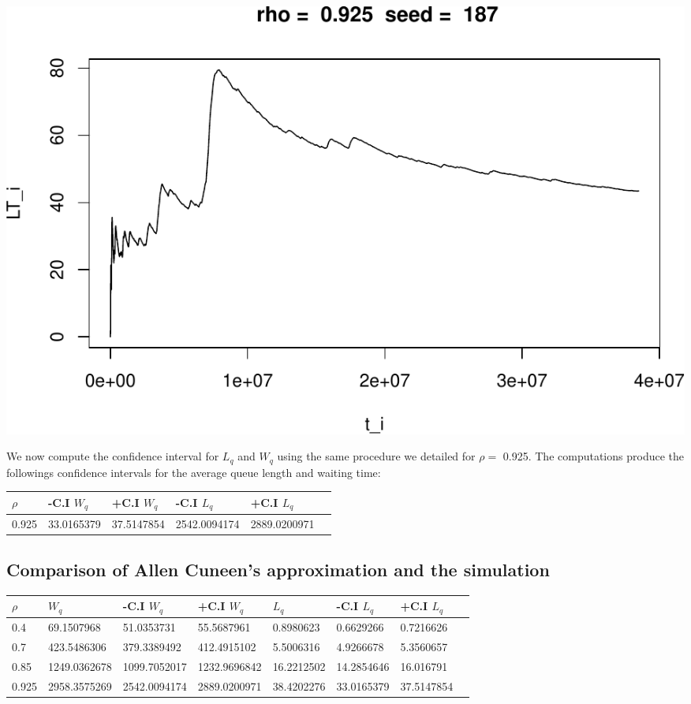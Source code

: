 \documentclass[]{article}
\begin{document}
\includegraphics{003_files/figure-latex/unnamed-chunk-22-10.pdf}

We now compute the confidence interval for \(L_{q}\) and \(W_{q}\) using
the same procedure we detailed for \(\rho =\) 0.925. The computations
produce the followings confidence intervals for the average queue length
and waiting time:

\begin{longtable}[]{@{}llllll@{}}
\toprule
\(\rho\) & -C.I \(W_{q}\) & +C.I \(W_{q}\) & -C.I \(L_{q}\) & +C.I
\(L_{q}\) &\tabularnewline
\midrule
\endhead
0.925 & 33.0165379 & 37.5147854 & 2542.0094174 &
2889.0200971\tabularnewline
\bottomrule
\end{longtable}

\subsection{Comparison of Allen Cuneen's approximation and the
simulation}\label{comparison-of-allen-cuneens-approximation-and-the-simulation}

\begin{longtable}[]{@{}llllllll@{}}
\toprule
\(\rho\) & \(W_{q}\) & -C.I \(W_{q}\) & +C.I \(W_{q}\) & \(L_{q}\) &
-C.I \(L_{q}\) & +C.I \(L_{q}\) &\tabularnewline
\midrule
\endhead
0.4 & 69.1507968 & 51.0353731 & 55.5687961 & 0.8980623 & 0.6629266 &
0.7216626\tabularnewline
0.7 & 423.5486306 & 379.3389492 & 412.4915102 & 5.5006316 & 4.9266678 &
5.3560657\tabularnewline
0.85 & 1249.0362678 & 1099.7052017 & 1232.9696842 & 16.2212502 &
14.2854646 & 16.016791\tabularnewline
0.925 & 2958.3575269 & 2542.0094174 & 2889.0200971 & 38.4202276 &
33.0165379 & 37.5147854\tabularnewline
\bottomrule
\end{longtable}
\end{document}
